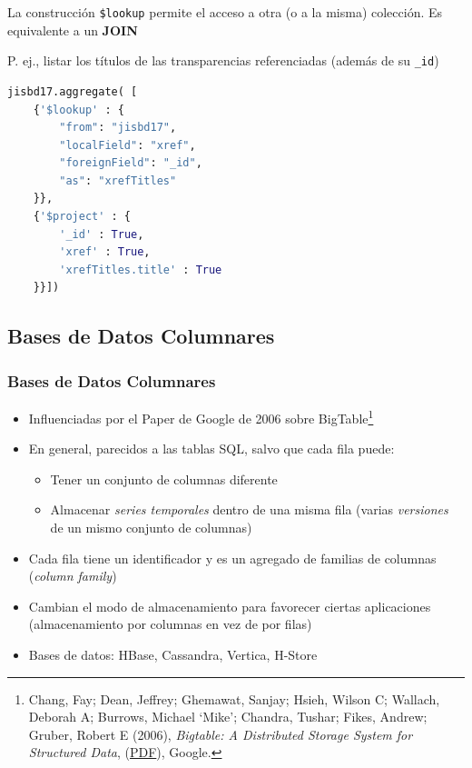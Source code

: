 \documentclass[14pt]{beamer}
\begin{document}
\begin{frame}
\begin{itemize}
\begin{frame}
La construcción
\verb|$lookup| permite el acceso a otra (o a la misma) colección. Es
equivalente a un {\bf JOIN}

\framebreak

\begin{block}{}
  P. ej., listar los títulos de las transparencias referenciadas
  (además de su {\tt \_id})

\begin{lstlisting}[language=python]
jisbd17.aggregate( [
    {'$lookup' : {
        "from": "jisbd17",
        "localField": "xref",
        "foreignField": "_id",
        "as": "xrefTitles"
    }},
    {'$project' : {
        '_id' : True,
        'xref' : True,
        'xrefTitles.title' : True
    }}])
\end{lstlisting}
\end{block}

\end{frame}

\subsection{Bases de Datos Columnares}

\begin{frame}[allowframebreaks]
  \frametitle{Bases de Datos Columnares}
\begin{itemize}
\item Influenciadas por el Paper de Google de 2006 sobre BigTable\footnote{Chang, Fay; Dean, Jeffrey; Ghemawat, Sanjay; Hsieh,
    Wilson C; Wallach, Deborah A; Burrows, Michael ‘Mike’; Chandra,
    Tushar; Fikes, Andrew; Gruber, Robert E (2006), {\em Bigtable: A
      Distributed Storage System for Structured Data},
    (\href{http://research.google.com/archive/bigtable-osdi06.pdf}{PDF}),
    Google.}
\item En general, parecidos a las tablas SQL, salvo que cada fila puede:
  \begin{itemize}
  \item Tener un conjunto de columnas diferente
\item Almacenar {\em series temporales} dentro de una misma fila (varias
  {\em versiones} de un mismo conjunto de columnas)
  \end{itemize}
\item Cada fila tiene un identificador y es un agregado de familias de
  columnas ({\em column family})

\item Cambian el modo de almacenamiento para favorecer ciertas aplicaciones
  (almacenamiento por columnas en vez de por filas)
\item Bases de datos: HBase, Cassandra, Vertica, H-Store
\end{itemize}
\end{frame}


\end{itemize}
\end{frame}
\end{document}

